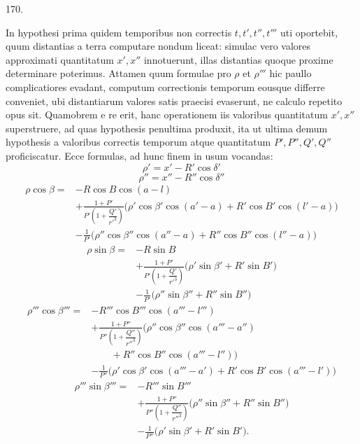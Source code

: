 \par{}\medskip
\begin{center}\hypertarget{native-235-article170}{}170.\end{center}
In hypothesi prima quidem temporibus non correctis $t,t',t'',t'''$ uti oportebit, quum distantias a terra computare nondum liceat: simulac vero valores approximati quantitatum $x',x''$ innotuerunt, illas distantias quoque proxime determinare poterimus. Attamen quum formulae pro $\rho$ et $\rho'''$ hic paullo complicatiores evadant, computum correctionis temporum eousque differre conveniet, ubi distantiarum valores satis praecisi evaserunt, ne calculo repetito opus sit. Quamobrem e re erit, hanc operationem iis valoribus quantitatum $x',x''$ superstruere, ad quas hypothesis penultima produxit, ita ut ultima demum hypothesis a valoribus correctis temporum atque quantitatum $P',P'',Q',Q''$ proficiscatur. Ecce formulas, ad hunc finem in usum vocandas:
\[
\tag*{VII.}
\rho'=x'-R'\cos\delta'
\]
\[
\tag*{VIII.}
\rho''=x''-R''\cos\delta''
\]
\[
\tag*{IX.}
\begin{aligned}
\rho\cos\beta={}&-R\cos B\cos(a-l)\\
&+\frac{1+P'}{P'\left(1+\dfrac{Q'}{r'^3}\right)}\bigl(\rho'\cos\beta'\cos(a'-a)+R'\cos B'\cos(l'-a)\bigr)\\
&-\frac{1}{P'}\bigl(\rho''\cos\beta''\cos(a''-a)+R''\cos B''\cos(l''-a)\bigr)
\end{aligned}
\]
\[
\tag*{X.}
\begin{aligned}
\rho\sin\beta={}&-R\sin B\\
&+\frac{1+P'}{P'\left(1+\dfrac{Q'}{r'^3}\right)}\bigl(\rho'\sin\beta'+R'\sin B'\bigr)\\
&-\frac{1}{P'}\bigl(\rho''\sin\beta''+R''\sin B''\bigr)
\end{aligned}
\]
\[
\tag*{XI.}
\begin{aligned}
\rho'''\cos\beta'''={}&-R'''\cos B'''\cos(a'''-l''')\\
&+\frac{1+P''}{P''\left(1+\dfrac{Q''}{r''^3}\right)}\bigl(\rho''\cos\beta''\cos(a'''-a'')\\
&\qquad{}+R''\cos B''\cos(a'''-l'')\bigr)\\
&-\frac{1}{P''}\bigl(\rho'\cos\beta'\cos(a'''-a')+R'\cos B'\cos(a'''-l')\bigr)
\end{aligned}
\]
\[
\tag*{XII.}
\begin{aligned}
\rho'''\sin\beta'''={}&-R'''\sin B'''\\
&+\frac{1+P''}{P''\left(1+\dfrac{Q''}{r''^3}\right)}\bigl(\rho''\sin\beta''+R''\sin B''\bigr)\\
&-\frac{1}{P''}\bigl(\rho'\sin\beta'+R'\sin B'\bigr).
\end{aligned}
\]

